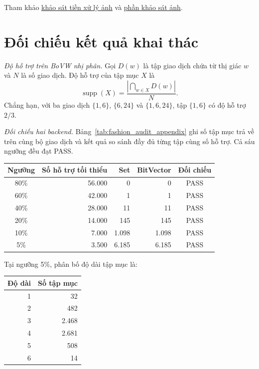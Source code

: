 Tham khảo \href{https://github.com/NguyenVoTanDuy2006/DataMining-FIM-Project/blob/dbadabc4af05070c602b3bcd890150fcd496c885/docs/UD2/TC_plan.md}{khảo sát tiền xử lý ảnh} và \href{https://github.com/NguyenVoTanDuy2006/DataMining-FIM-Project/blob/dbadabc4af05070c602b3bcd890150fcd496c885/notebook/UD2/demo/01_image_exploration.ipynb}{phần khảo sát ảnh}.

\newpage
\section{Đối chiếu kết quả khai thác}
\label{app:fashion_eclat}

\textit{Độ hỗ trợ trên BoVW nhị phân.}
Gọi $D(w)$ là tập giao dịch chứa từ thị giác $w$ và $N$ là số giao dịch. Độ hỗ trợ của tập mục $X$ là
\[
    \operatorname{supp}(X)
    = \frac{\left|\bigcap_{w\in X} D(w)\right|}{N}.
\]
Chẳng hạn, với ba giao dịch $\{1,6\}$, $\{6,24\}$ và $\{1,6,24\}$, tập $\{1,6\}$ có độ hỗ trợ $2/3$.

\textit{Đối chiếu hai backend.}
Bảng~\ref{tab:fashion_audit_appendix} ghi số tập mục trả về trên cùng bộ giao dịch và kết quả so sánh đầy đủ từng tập cùng số hỗ trợ. Cả sáu ngưỡng đều đạt PASS.

\begin{center}
    \label{tab:fashion_audit_appendix}
    \footnotesize
    \setlength{\tabcolsep}{4pt}
    \begin{tabular}{@{}crrrc@{}}
        \toprule
        Ngưỡng & Số hỗ trợ tối thiểu & Set & BitVector & Đối chiếu \\
        \midrule
        80\% & 56.000 & 0 & 0 & PASS \\
        60\% & 42.000 & 1 & 1 & PASS \\
        40\% & 28.000 & 11 & 11 & PASS \\
        20\% & 14.000 & 145 & 145 & PASS \\
        10\% & 7.000 & 1.098 & 1.098 & PASS \\
         5\% & 3.500 & 6.185 & 6.185 & PASS \\
        \bottomrule
    \end{tabular}
\end{center}

Tại ngưỡng 5\%, phân bố độ dài tập mục là:

\begin{center}
    \label{tab:fashion_itemset_lengths}
    \footnotesize
    \begin{tabular}{@{}rr@{}}
        \toprule
        Độ dài & Số tập mục \\
        \midrule
        1 & 32 \\
        2 & 482 \\
        3 & 2.468 \\
        4 & 2.681 \\
        5 & 508 \\
        6 & 14 \\
        \bottomrule
    \end{tabular}
\end{center}

